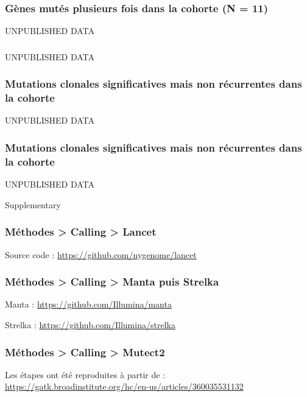 \documentclass[aspectratio=1610]{beamer}
\begin{document}
\begin{frame}
  \frametitle{ Gènes mutés plusieurs fois dans la cohorte (N = 11)}  
  \begin{center}
    UNPUBLISHED DATA
  \end{center}
\end{frame}

\begin{frame}
  \frametitle{ }
  \begin{center}
    UNPUBLISHED DATA
  \end{center}  
\end{frame}

\begin{frame}
  \frametitle{ Mutations clonales significatives mais non récurrentes dans la cohorte}
  \begin{center}
    UNPUBLISHED DATA
  \end{center}
\end{frame}

\begin{frame}
  \frametitle{ Mutations clonales significatives mais non récurrentes dans la cohorte}
  \begin{center}
    UNPUBLISHED DATA
  \end{center}
\end{frame}

\begin{frame}[standout]
  Supplementary
\end{frame}

\begin{frame}
  \frametitle{ Méthodes > Calling > Lancet}
  Source code : \url{https://github.com/nygenome/lancet}
  \vskip 0.2in
  
\end{frame}

\begin{frame}
  \frametitle{ Méthodes > Calling > Manta puis Strelka}
  \begin{footnotesize}
    Manta : \url{https://github.com/Illumina/manta}
    
    Strelka : \url{https://github.com/Illumina/strelka}
    
  \end{footnotesize}
\end{frame}

\begin{frame}
  \frametitle{ Méthodes > Calling > Mutect2}
  Les étapes ont été reproduites à partir de : \footnotesize \url{https://gatk.broadinstitute.org/hc/en-us/articles/360035531132}
  
\end{frame}
\end{document}
